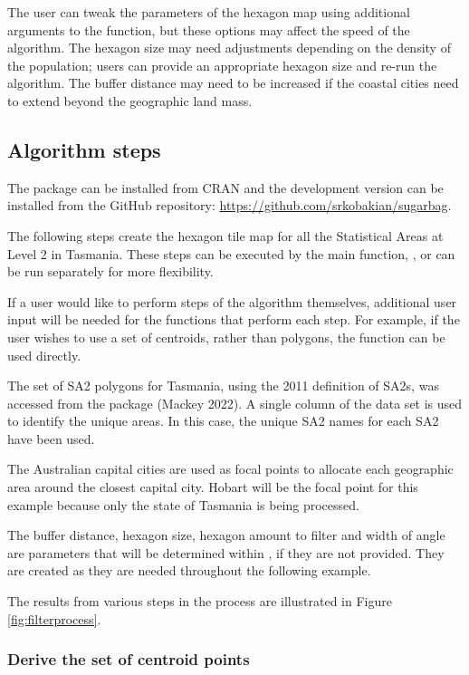 The user can tweak the parameters of the hexagon map using additional arguments to the  function, but these options may affect the speed of the algorithm.
The hexagon size may need adjustments depending on the density of the population; users can provide an appropriate hexagon size and re-run the algorithm. The buffer distance may need to be increased if the coastal cities need to extend beyond the geographic land mass.

\hypertarget{algorithm-steps}{%
\subsection{Algorithm steps}\label{algorithm-steps}}

The package can be installed from CRAN and the development version can be installed from the GitHub repository: \url{https://github.com/srkobakian/sugarbag}.

The following steps create the hexagon tile map for all the Statistical Areas at Level 2 in Tasmania. These steps can be executed by the main function, , or can be run separately for more flexibility.

If a user would like to perform steps of the algorithm themselves, additional user input will be needed for the functions that perform each step. For example, if the user wishes to use a set of centroids, rather than polygons, the  function can be used directly.

The set of SA2 polygons for Tasmania, using the 2011 definition of SA2s, was accessed from the  package (Mackey 2022). A single column of the data set is used to identify the unique areas. In this case, the unique SA2 names for each SA2 have been used.

The Australian capital cities are used as focal points to allocate each geographic area around the closest capital city. Hobart will be the focal point for this example because only the state of Tasmania is being processed.

The buffer distance, hexagon size, hexagon amount to filter and width of angle are parameters that will be determined within , if they are not provided. They are created as they are needed throughout the following example.

The results from various steps in the process are illustrated in Figure \ref{fig:filterprocess}.

\hypertarget{derive-the-set-of-centroid-points}{%
\subsubsection{Derive the set of centroid points}\label{derive-the-set-of-centroid-points}}


